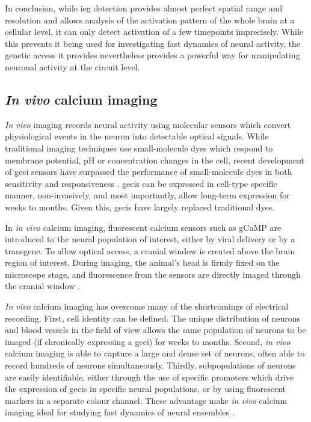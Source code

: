 In conclusion, while \gls{ieg} detection provides almost perfect spatial range and resolution and allows analysis of the activation pattern of the whole brain at a cellular level, it can only detect activation of a few timepoints imprecisely. While this prevents it being used for investigating fast dynamics of neural activity, the genetic access it provides nevertheless provides a powerful way for manipulating neuronal activity at the circuit level.


\subsection{\textit{In vivo} calcium imaging}

\textit{In vivo} imaging records neural activity using molecular sensors which convert physiological events in the neuron into detectable optical signals. While traditional imaging techniques use small-molecule dyes which respond to membrane potential, pH or  concentration changes in the cell, recent development of \gls{geci}  sensors have surpassed the performance of small-molecule  dyes in both sensitivity and responsiveness \citep{lutcke13}. \Glspl{geci} can be expressed in cell-type specific manner, non-invasively, and most importantly, allow long-term expression for weeks to months. Given this, \glspl{geci} have largely replaced traditional dyes. 

In \textit{in vivo} calcium imaging, fluorescent calcium sensors such as gCaMP are introduced to the neural population of interest, either by viral delivery or by a transgene. To allow optical access, a cranial window is created above the brain region of interest. During imaging, the animal's head is firmly fixed on the microscope stage, and fluorescence from the sensors are directly imaged through the cranial window \citep{lutcke13, yang17}. 

\textit{In vivo} calcium imaging has overcome many of the shortcomings of electrical recording. First, cell identity can be defined. The unique distribution of neurons and blood vessels in the field of view allows the same population of neurons to be imaged (if chronically expressing a \gls{geci}) for weeks to months. Second, \textit{in vivo} calcium imaging is able to capture a large and dense set of neurons, often able to record hundreds of neurons simultaneously. Thirdly, subpopulations of neurons are easily identifiable, either through the use of specific promoters which drive the expression of \glspl{geci} in specific neural populations, or by using fluorescent markers in a separate colour channel. These advantage make \textit{in vivo} calcium imaging ideal for studying fast dynamics of neural ensembles \citep{lutcke13}. 

